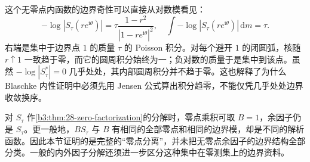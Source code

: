 \ProseParagraphBreak

这个无零点内函数的边界奇性可以直接从对数模看见：
\[
 -\log|S_\tau(re^{\mathrm i\theta})|
 =\tau\frac{1-r^2}{|1-re^{\mathrm i\theta}|^2},
 \quad
 \int-\log|S_\tau(re^{\mathrm i\theta})|\,\mathrm dm=\tau.
\]
右端是集中于边界点 \(1\) 的质量 \(\tau\) 的 Poisson 积分。对每个避开 \(1\) 的闭圆弧，核随 \(r\uparrow1\) 一致趋于零，而它的圆周积分始终为一；负对数的质量于是集中到该点。虽然 \(-\log|S_\tau^*|=0\) 几乎处处，其内部圆周积分并不趋于零。这也解释了为什么 Blaschke 内性证明中必须先用 Jensen 公式算出积分趋零，不能仅凭几乎处处边界收敛换序。

\ProseParagraphBreak

对 \(S_\tau\) 作\cref{b3:thm:28-zero-factorization}的分解时，零点乘积可取 \(B=1\)，余因子仍是 \(S_\tau\)。更一般地，\(BS_\tau\) 与 \(B\) 有相同的全部零点和相同的边界模，却是不同的解析函数。因此本节证明的是完整的“零点分离”，并未把无零点余因子的边界结构全部分类。一般的内外因子分解还须进一步区分这种集中在零测集上的边界资料。
